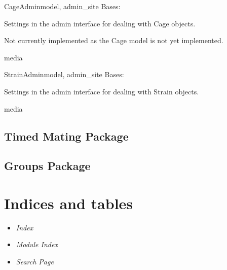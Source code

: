 \documentclass[letterpaper,10pt,english]{sphinxmanual}
\begin{document}
\hypertarget{animal.admin.CageAdmin}{}\begin{classdesc}{CageAdmin}{model, admin\_site}
Bases: 

Settings in the admin interface for dealing with Cage objects.

Not currently implemented as the Cage model is not yet implemented.

\hypertarget{animal.admin.CageAdmin.media}{}\begin{memberdesc}{media}\end{memberdesc}
\end{classdesc}

\hypertarget{animal.admin.StrainAdmin}{}\begin{classdesc}{StrainAdmin}{model, admin\_site}
Bases: 

Settings in the admin interface for dealing with Strain objects.

\hypertarget{animal.admin.StrainAdmin.media}{}\begin{memberdesc}{media}\end{memberdesc}
\end{classdesc}


\section{Timed Mating Package}
\hypertarget{module-timed\_mating}{}
\modulesynopsis{}

\section{Groups Package}
\hypertarget{module-groups}{}
\modulesynopsis{}

\chapter{Indices and tables}
\begin{itemize}
\item {} 
\emph{Index}

\item {} 
\emph{Module Index}

\item {} 
\emph{Search Page}

\end{itemize}


\renewcommand{\indexname}{Module Index}
\printmodindex
\renewcommand{\indexname}{Index}
\printindex
\end{document}

